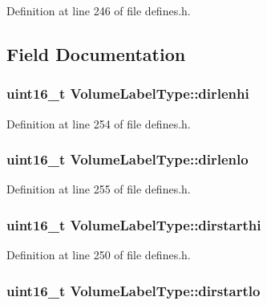 Definition at line 246 of file defines.\+h.



\subsection{Field Documentation}
\subsubsection[{\texorpdfstring{dirlenhi}{dirlenhi}}]{\setlength{\rightskip}{0pt plus 5cm}uint16\+\_\+t Volume\+Label\+Type\+::dirlenhi}\hypertarget{structVolumeLabelType_a6fa349ef78a7ea0a3006e0c1f4f3a155}{}\label{structVolumeLabelType_a6fa349ef78a7ea0a3006e0c1f4f3a155}


Definition at line 254 of file defines.\+h.

\subsubsection[{\texorpdfstring{dirlenlo}{dirlenlo}}]{\setlength{\rightskip}{0pt plus 5cm}uint16\+\_\+t Volume\+Label\+Type\+::dirlenlo}\hypertarget{structVolumeLabelType_ae1c5205294bf4588b931057d03853d66}{}\label{structVolumeLabelType_ae1c5205294bf4588b931057d03853d66}


Definition at line 255 of file defines.\+h.

\subsubsection[{\texorpdfstring{dirstarthi}{dirstarthi}}]{\setlength{\rightskip}{0pt plus 5cm}uint16\+\_\+t Volume\+Label\+Type\+::dirstarthi}\hypertarget{structVolumeLabelType_aac87a089bec0cf282bf23038937d7635}{}\label{structVolumeLabelType_aac87a089bec0cf282bf23038937d7635}


Definition at line 250 of file defines.\+h.

\subsubsection[{\texorpdfstring{dirstartlo}{dirstartlo}}]{\setlength{\rightskip}{0pt plus 5cm}uint16\+\_\+t Volume\+Label\+Type\+::dirstartlo}\hypertarget{structVolumeLabelType_a193c89f442656a080244f284f1bc008a}{}\label{structVolumeLabelType_a193c89f442656a080244f284f1bc008a}


